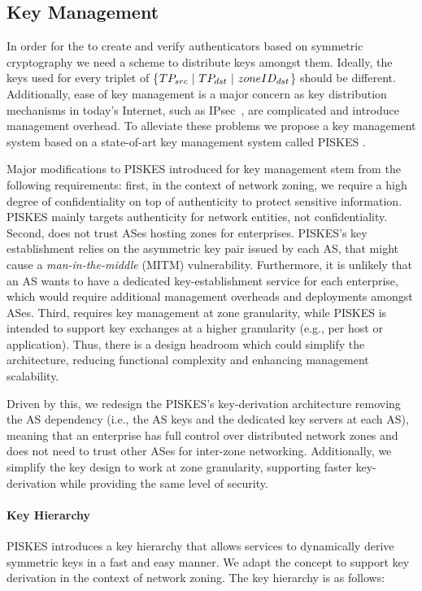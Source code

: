 \subsection{Key Management}
\label{ssec:keymanagement}

In order for the \tps to create and verify authenticators based on symmetric cryptography 
we need a scheme to distribute keys amongst them. Ideally, the keys used for every 
triplet of \{$TP_{src}~|~TP_{dst}~|~zoneID_{dst}$\} should be different. Additionally, 
ease of key management is a major concern as key distribution mechanisms in today's 
Internet, such as IPsec~\cite{rfc2408,rfc2409,rfc4306}, are complicated and introduce 
management overhead. To alleviate these problems we propose a key management system 
based on a state-of-art key management system called PISKES \cite{rot2020piskes}.

Major modifications to PISKES introduced for \name key management stem from the following requirements: first,
in the context of network zoning, we require a high degree of confidentiality on top of
authenticity to protect sensitive information. PISKES mainly targets authenticity for 
network entities, not confidentiality. Second, \name does not trust ASes hosting zones
for enterprises. PISKES's key establishment relies on the asymmetric key pair issued by
each AS, that might cause a \textit{man-in-the-middle} (MITM) vulnerability. Furthermore, it is unlikely that an AS 
wants to have a dedicated key-establishment service for each enterprise, which would require 
additional management overheads and deployments amongst ASes. Third, \name requires key 
management at zone granularity, while PISKES is intended to support key exchanges at a 
higher granularity (e.g., per host or application). Thus, there is a design headroom which 
could simplify the architecture, reducing functional complexity and enhancing management
scalability.

Driven by this, we redesign the PISKES's key-derivation architecture removing the
AS dependency (i.e., the AS keys and the dedicated key servers at each AS), meaning
that an enterprise has full control over distributed network zones and does not
need to trust other ASes for inter-zone networking. Additionally, we simplify the key 
design to work at zone granularity, supporting faster key-derivation while
providing the same level of security. 

\paragraph{Key Hierarchy}
PISKES introduces a key hierarchy that allows services to dynamically derive symmetric 
keys in a fast and easy manner. We adapt the concept to support key derivation in the 
context of network zoning. The key hierarchy is as follows:

